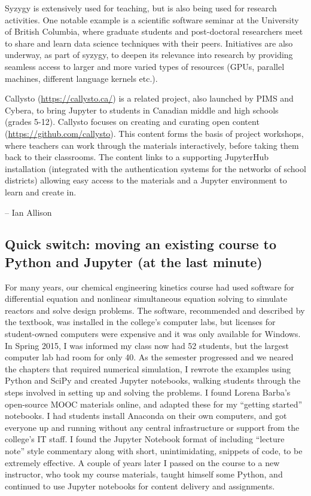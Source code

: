 \documentclass[]{book}
\begin{document}
Syzygy is extensively used for teaching, but is also being used for
research activities. One notable example is a scientific software
seminar at the University of British Columbia, where graduate students
and post-doctoral researchers meet to share and learn data science
techniques with their peers. Initiatives are also underway, as part of
syzygy, to deepen its relevance into research by providing seamless
access to larger and more varied types of resources (GPUs, parallel
machines, different language kernels etc.).

Callysto (\url{https://callysto.ca/}) is a related
project, also launched by PIMS and Cybera, to bring Jupyter to
students in Canadian middle and high schools (grades 5-12). Callysto
focuses on creating and curating open content
(\url{https://github.com/callysto}). This
content forms the basis of project workshops, where teachers can work
through the materials interactively, before taking them back to their
classrooms. The content links to a supporting JupyterHub installation
(integrated with the authentication systems for the networks of school
districts) allowing easy access to the materials and a Jupyter
environment to learn and create in.

-- Ian Allison

\hypertarget{quick-switch-moving-an-existing-course-to-python-and-jupyter-at-the-last-minute}{%
\subsection{Quick switch: moving an existing course to Python and Jupyter (at the last minute)}\label{quick-switch-moving-an-existing-course-to-python-and-jupyter-at-the-last-minute}}

For many years, our chemical engineering kinetics course had used
software for differential equation and nonlinear simultaneous equation
solving to simulate reactors and solve design problems. The software,
recommended and described by the textbook, was installed in the
college's computer labs, but licenses for student-owned computers were
expensive and it was only available for Windows. In Spring 2015, I
was informed my class now had 52 students, but the largest computer
lab had room for only 40. As the semester progressed and we neared the
chapters that required numerical simulation, I rewrote the examples
using Python and SciPy and created Jupyter notebooks, walking students
through the steps involved in setting up and solving the problems. I
found Lorena Barba's open-source MOOC materials online, and adapted
these for my ``getting started'' notebooks. I had students install
Anaconda on their own computers, and got everyone up and running
without any central infrastructure or support from the college's IT
staff. I found the Jupyter Notebook format of including ``lecture note''
style commentary along with short, unintimidating, snippets of code,
to be extremely effective. A couple of years later I passed on the
course to a new instructor, who took my course materials, taught
himself some Python, and continued to use Jupyter notebooks for
content delivery and assignments.
\end{document}
